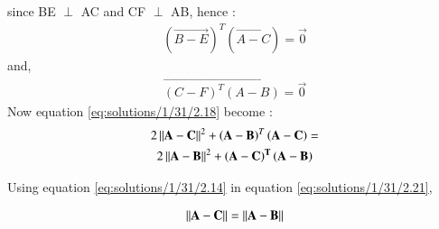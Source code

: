 since BE $\perp$ AC and CF $\perp$ AB, hence :
\begin{align}
 \left ( \vec{   B - E }\right)^T \left( \vec{A - C} \right) = \vec{0}
 \end{align}
  and, 
  \begin{align}
   \vec{\left (  C - F\right)^{T} \left( A - B \right)} = \vec{0}
\end{align}
Now equation \ref{eq:solutions/1/31/2.18} become :
 \begin{multline}
2\left\lVert\mathbf{A - C}\right\rVert^2 + \left ( \mathbf{  A - B  }\right)^T \left( \mathbf{A - C} \right)    =  \\ 2 \left\lVert\mathbf{A - B}\right\rVert^2 + \mathbf{\left ( A - C \right)^{T} \left( A - B \right)} \label{eq:solutions/1/31/2.21}
 \end{multline} 

  Using equation \ref{eq:solutions/1/31/2.14} in equation \ref{eq:solutions/1/31/2.21},
  
  \begin{align}
  \left\lVert\mathbf{A - C} \right\rVert = \left\lVert\mathbf{A - B}\right\rVert
  \end{align}
  
  
  
  
  
  
